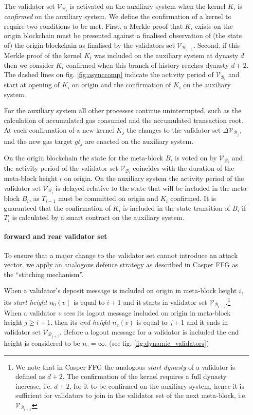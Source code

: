 \documentclass[12pt,a4paper]{article}
\begin{document}
The validator set $\mathcal{V}_{\mathcal{B}_i}$ is activated on the auxiliary system when the kernel $K_i$ is \emph{confirmed} on the auxiliary system.
We define the confirmation of a kernel to require two conditions to be met.
First, a Merkle proof that $K_i$ exists on the origin blockchain must be presented against a finalised observation of (the state of) the origin blockchain as finalised by the validators set $\mathcal{V}_{\mathcal{B}_{i-1}}$.
Second, if this Merkle proof of the kernel $K_i$ was included on the auxiliary system at dynasty $d$ then we consider $K_i$ confirmed when this branch of history reaches dynasty $d+2$. The dashed lines on fig. \ref{fig:asynccomp} indicate the activity period of $\mathcal{V}_{\mathcal{B}_i}$ and start at opening of $K_i$ on origin and the confirmation of $K_i$ on the auxiliary system.

For the auxiliary system all other processes continue uninterrupted, such as the calculation of accumulated gas consumed and the accumulated transaction root.
At each confirmation of a new kernel $K_j$ the changes to the validator set $\Delta\mathcal{V}_{\mathcal{B}_j}$, and the new gas target $gt_j$ are enacted on the auxiliary system.

On the origin blockchain the state for the meta-block $B_i$ is voted on by $\mathcal{V}_{\mathcal{B}_i}$ and the activity period of the validator set $\mathcal{V}_{\mathcal{B}_i}$ coincides with the duration of the meta-block height $i$ on origin.
On the auxiliary system the activity period of the validator set $\mathcal{V}_{\mathcal{B}_i}$ is delayed relative to the state that will be included in the meta-block $B_i$, as $T_{i-1}$ must be committed on origin and $K_i$ confirmed.
It is guaranteed that the confirmation of $K_i$ is included in the state transition of $B_i$ if $T_i$ is calculated by a smart contract on the auxiliary system.

\paragraph{forward and rear validator set} To ensure that a major change to the validator set cannot introduce an attack vector, we apply an analogous defence strategy as described in Casper FFG\cite{casperffg} as the ``stitching mechanism''.

When a validator's deposit message is included on origin in meta-block height $i$, its \emph{start height} $n_0(v)$ is equal to $i+1$ and it starts in validator set $\mathcal{V}_{\mathcal{B}_{i+1}}$.\footnote{
  We note that in Casper FFG\cite{casperffg} the analogous \emph{start dynasty} of a validator is defined as $d+2$.
  The confirmation of the kernel requires a full dynasty increase, i.e. $d+2$, for it to be confirmed on the auxiliary system, hence it is sufficient for validators to join in the validator set of the next meta-block, i.e. $\mathcal{V}_{\mathcal{B}_{i+1}}$}
When a validator $v$ sees its logout message included on origin in meta-block height $j \geq i + 1$, then its \emph{end height} $n_e(v)$ is equal to $j+1$ and it ends in validator set $\mathcal{V}_{\mathcal{B}_{j+1}}$.
Before a logout message for a validator is included the end height is considered to be $n_e = \infty$. (see fig. \ref{fig:dynamic_validators})
\end{document}
